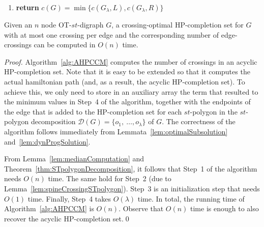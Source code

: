 \documentclass{myllncs-mixalis}
\begin{document}
\begin{algorithm2e}[tb]
\begin{enumerate}
    \hspace*{1.4cm} \textbf{if} $t_{i-1} \in V^l$, \textbf{then} \\
        \hspace*{2.1cm}  $c(G_{i},L)=\min \{ c(G_{i-1},L)+c(o_{i},L)+1,~c(G_{i-1},R)+c(o_{i},L) \}
        $\\
        \hspace*{2.1cm}  $c(G_{i},R)=\min \{
        c(G_{i-1},L)+c(o_{i},R),~c(G_{i-1},R)+c(o_{i},R)\}$\\

    \hspace*{1.4cm} \textbf{else} \{ $t_{i-1} \in V^r$ \} \\
        \hspace*{2.1cm} $c(G_{i},L)=\min \{ c(G_{i-1},L)+c(o_{i},L),~c(G_{i-1},R)+c(o_{i},L)
\} $\\
        \hspace*{2.1cm}  $c(G_{i},R)=\min \{c(G_{i-1},L)+c(o_{i},R),~c(G_{i-1},R)+c(o_{i},R)+1
\} $\\
\item \textbf{return} $c(G)= \min\{ c(G_\lambda, L), c(G_\lambda,R) \}$
\end{enumerate}
\end{algorithm2e}


\begin{theorem}
\label{thm:optimalAcyclicHPCCM} Given an  $n$ node OT-$st$-digraph
$G$, a  crossing-optimal HP-completion set for $G$ with at most one
crossing per edge and the corresponding number of edge-crossings can
be computed in $O(n)$ time.
\end{theorem}

\begin{proof}
Algorithm~\ref{alg:AHPCCM} computes the number of crossings in an
acyclic HP-completion set. Note that it is easy to be extended so
that it computes the actual hamiltonian path (and, as a result, the
acyclic HP-completion set). To achieve this, we only need to store
in an auxiliary array the term that resulted to the minimum values
in Step~4 of the algorithm, together with the endpoints of the edge
that is added to the HP-completion set for each $st$-polygon in the
$st$-polygon decomposition $\mathcal{D}(G)= \{ o_1,~ \ldots,
o_\lambda \}$ of $G$. The correctness of the algorithm follows
immediately from Lemmata~\ref{lem:optimalSubsolution}
and~\ref{lem:dynProgSolution}.

From Lemma~\ref{lem:medianComputation} and
Theorem~\ref{thm:STpolygonDecomposition}, it follows that Step~1 of
the algorithm needs $O(n)$ time. The same hold for Step~2 (due to
Lemma~\ref{lem:spineCrossingSTpolygon}). Step~3 is an initialization
step that needs $O(1)$ time. Finally, Step~4 takes $O(\lambda)$
time. In total, the running time of  Algorithm~\ref{alg:AHPCCM} is
$O(n)$. Observe that $O(n)$ time is enough to also recover the
acyclic HP-completion set.\qed
\end{proof}
\end{document}
